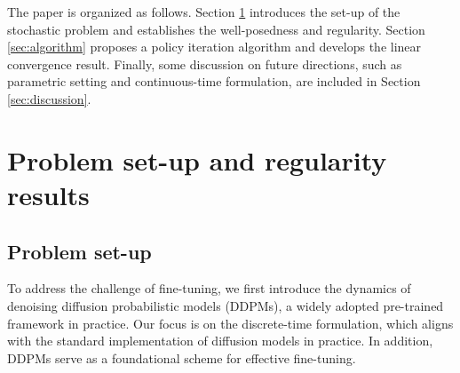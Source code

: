 \documentclass{article}
\begin{document}
The paper is organized as follows. Section \ref{sec:set-up} introduces the set-up of the stochastic problem  and establishes the well-posedness and regularity. Section \ref{sec:algorithm} proposes a policy iteration algorithm and develops the linear convergence result. Finally, some discussion on future directions, such as parametric setting and continuous-time formulation, are included in Section \ref{sec:discussion}.

\section{Problem set-up and regularity results}
\label{sec:set-up}


\subsection{Problem set-up}
To address the challenge of fine-tuning, we first introduce the dynamics of denoising diffusion probabilistic models (DDPMs), a widely adopted pre-trained framework in practice. Our focus is on the discrete-time formulation, which aligns with the standard implementation of diffusion models in practice. In addition, DDPMs serve as a foundational scheme for effective fine-tuning.
\end{document}
